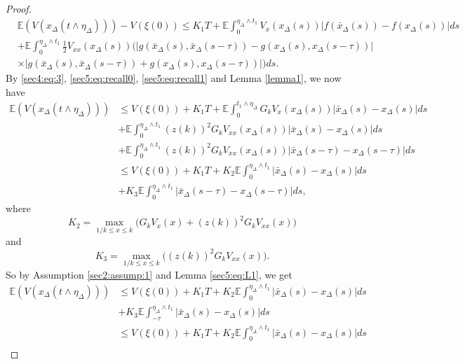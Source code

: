 \documentclass[11pt]{article}
\begin{document}
\begin{proof}
\begin{align*}
&\mathbb{E}(V(x_{\Delta}(t\wedge \eta_{\Delta})))-V(\xi(0))\le K_1T+\mathbb{E}\int_{0}^{\eta_{\Delta}\wedge t_1}V_x(x_{\Delta}(s))\vert f(\bar{x}_{\Delta}(s))-f(x_{\Delta}(s))\vert ds\\
&+\mathbb{E}\int_{0}^{\eta_{\Delta}\wedge t_1}\frac{1}{2}V_{xx}(x_{\Delta}(s))\Big(\vert g(\bar{x}_{\Delta}(s),\bar{x}_{\Delta}(s-\tau))-g(x_{\Delta}(s),x_{\Delta}(s-\tau))\vert\\
&\times \vert g(\bar{x}_{\Delta}(s),\bar{x}_{\Delta}(s-\tau))+g(x_{\Delta}(s),x_{\Delta}(s-\tau))\vert \Big) ds.
\end{align*}
By \eqref{sec4:eq:3}, \eqref{sec5:eq:recall0}, \eqref{sec5:eq:recall1} and Lemma \ref{lemma1}, we now have
\begin{align*}
\mathbb{E}(V(x_{\Delta}(t\wedge \eta_{\Delta})))&\le V(\xi(0))+K_1T+\mathbb{E}\int_{0}^{t_1\wedge\eta_{\Delta}}G_kV_x(x_{\Delta}(s))\vert \bar{x}_{\Delta}(s)-x_{\Delta}(s)\vert ds\\
&+\mathbb{E}\int_{0}^{\eta_{\Delta}\wedge t_1}(z(k))^2G_kV_{xx}(x_{\Delta}(s))\vert \bar{x}_{\Delta}(s)-x_{\Delta}(s)\vert ds\\
&+\mathbb{E}\int_{0}^{\eta_{\Delta}\wedge t_1}(z(k))^2G_kV_{xx}(x_{\Delta}(s))\vert \bar{x}_{\Delta}(s-\tau)-x_{\Delta}(s-\tau)\vert ds\\
&\le V(\xi(0))+K_1T+K_2\mathbb{E}\int_0^{\eta_{\Delta}\wedge t_1} \vert \bar{x}_{\Delta}(s)-x_{\Delta}(s)\vert ds\\
&+K_3\mathbb{E}\int_{0}^{\eta_{\Delta}\wedge t_1}\vert \bar{x}_{\Delta}(s-\tau)-x_{\Delta}(s-\tau)\vert ds,
\end{align*}
where
\begin{equation*}
K_2=\max_{1/k\le x\le k}\Big(G_kV_x(x)+(z(k))^2G_kV_{xx}(x)\Big)
\end{equation*}
and
\begin{equation*}
K_3=\max_{1/k\le x\le k}\Big((z(k))^2G_kV_{xx}(x)\Big).
\end{equation*}
So by Assumption \ref{sec2:assump:1} and Lemma \ref{sec5:eq:L1}, we get
\begin{align*}
\mathbb{E}(V(x_{\Delta}(t\wedge \eta_{\Delta})))&\le V(\xi(0))+K_1T+K_2\mathbb{E}\int_0^{\eta_{\Delta}\wedge t_1} \vert \bar{x}_{\Delta}(s)-x_{\Delta}(s)\vert ds\\
&+K_3\mathbb{E}\int_{-\tau}^{\eta_{\Delta}\wedge t_1}\vert \bar{x}_{\Delta}(s)-x_{\Delta}(s)\vert ds\\
&\le V(\xi(0))+K_1T+
K_2\mathbb{E}\int_{0}^{\eta_{\Delta}\wedge t_1} \vert \bar{x}_{\Delta}(s)-x_{\Delta}(s)\vert ds\\

\end{align*}
\end{proof}
\end{document}
